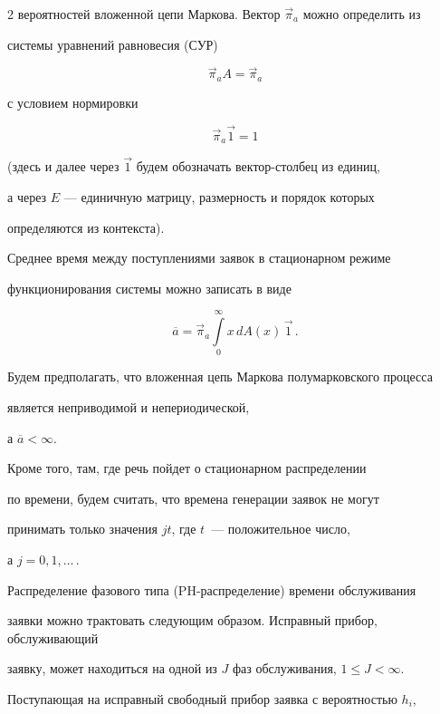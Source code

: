 \begin{multicols}{2}
вероятностей вложенной цепи Маркова. Вектор $\vec\pi_a$ можно определить из 


системы уравнений равновесия (СУР)





\noindent


$$


\vec\pi_a A = \vec\pi_a


$$


с условием нормировки


$$


\vec\pi_a \vec1 = 1


$$


(здесь и далее через $\vec1$ будем обозначать вектор-столбец из единиц,


а через $E$ --- единичную матрицу, размерность и порядок которых


определяются из контекста).


Среднее время между поступлениями заявок в стационарном режиме


функционирования системы можно записать в виде


$$


\overline a = \vec\pi_a \int\limits_0^\infty x\, dA(x)\, \vec1\,.


$$


Будем предполагать, что вложенная цепь Маркова полумарковского процесса


является неприводимой и непериодической,


а $\overline a < \infty$.


Кроме того, там, где речь пойдет о стационарном распределении


по времени, будем считать, что времена генерации заявок не могут


принимать только значения $jt$, где $t$~--- положительное число,


а $j=0,1,\ldots\,.$








Распределение фазового типа (PH-рас\-пре\-де\-ле\-ние) времени обслуживания


заявки можно трактовать следующим образом. Исправный прибор, обслуживающий 


заявку, может находиться на одной из $J$ фаз обслуживания, $1\le J <\infty$. 


Поступающая на исправный свободный прибор заявка с вероятностью $h_i$, 



\end{multicols}

